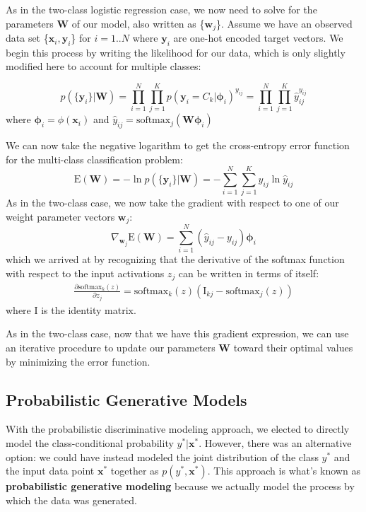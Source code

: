 As in the two-class logistic regression case, we now need to solve for the parameters \textbf{W} of our model, also written as \{$\textbf{w}_{j}$\}. Assume we have an observed data set \{$\textbf{x}_{i}, \textbf{y}_{i}$\} for $i=1..N$ where $\textbf{y}_{i}$ are one-hot encoded target vectors.  We begin this process by writing the likelihood for our data, which is only slightly modified here to account for multiple classes:

\begin{equation} \label{multi-class-log-reg-likelihood}
	p(\{\textbf{y}_{i}\}|\textbf{W}) = \prod_{i=1}^{N}\prod_{j=1}^{K} p(\textbf{y}_{i}=C_{k}|\boldsymbol{\phi}_{i})^{y_{ij}} = \prod_{i=1}^{N}\prod_{j=1}^{K} \hat{y}_{ij}^{y_{ij}}
\end{equation}
where $\boldsymbol{\phi}_{i} = \phi(\textbf{x}_{i})$ and $\hat{y}_{ij} = \text{softmax}_{j}(\textbf{W}\boldsymbol{\phi}_{i})$ \newline

We can now take the negative logarithm to get the cross-entropy error function for the multi-class classification problem:
\begin{equation} \label{multi-class-cross-entropy-error-fn}
	\mathrm{E}(\textbf{W}) = - \ln{p(\{\textbf{y}_{i}\}|\textbf{W})} = - \sum_{i=1}^{N}\sum_{j=1}^{K} y_{ij} \ln{\hat{y}_{ij}}
\end{equation}
As in the two-class case, we now take the gradient with respect to one of our weight parameter vectors $\textbf{w}_{j}$:
\begin{equation} \label{multi-class-log-reg-gradient}
	\nabla_{\textbf{w}_{j}} \mathrm{E}(\textbf{W}) = \sum_{i=1}^{N}(\hat{y}_{ij} - y_{ij})\boldsymbol{\phi}_{i}
\end{equation}
which we arrived at by recognizing that the derivative of the softmax function with respect to the input activations $z_{j}$ can be written in terms of itself:
\begin{align*}
	\frac{\partial \text{softmax}_{k}(z)}{\partial z_{j}} = \text{softmax}_{k}(z)(\mathrm{I}_{kj} - \text{softmax}_{j}(z))
\end{align*}
where $\mathrm{I}$ is the identity matrix.

As in the two-class case, now that we have this gradient expression, we can use an iterative procedure to update our parameters $\textbf{W}$ toward their optimal values by minimizing the error function.

\subsection{Probabilistic Generative Models}
With the probabilistic discriminative modeling approach, we elected to directly model the class-conditional probability $y^{*}|\textbf{x}^{*}$. However, there was an alternative option: we could have instead modeled the joint distribution of the class $y^{*}$ and the input data point $\textbf{x}^{*}$ together as $p(y^{*}, \textbf{x}^{*})$. This approach is what's known as \textbf{probabilistic generative modeling} because we actually model the process by which the data was generated.


